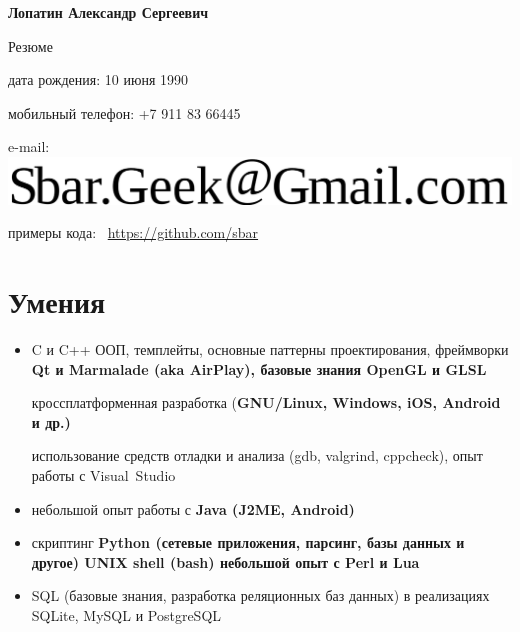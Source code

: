 \begin{center}
\fontsize{16pt}{14pt}\selectfont
\bfseries Лопатин Александр Сергеевич\mdseries

\fontsize{14pt}{14pt}\selectfont
Резюме
\end{center}
{
\fontsize{12pt}{12pt}\selectfont
\begin{flushright}
\item дата рождения: 10 июня 1990
\item мобильный телефон: +7 911 83 66445
\item e-mail: \includegraphics[scale=0.2]{email}
\item примеры кода: \
\href{https://github.com/sbar?tab=repositories}{https://github.com/sbar}
\end{flushright}
}

\setcounter{section}{0}
\section{Умения}
\begin{itemize}
\item C и C++
\subitem ООП, темплейты, основные паттерны проектирования,
фреймворки
\bfseries Qt \mdseries и
\bfseries Marmalade \mdseries
(aka \bfseries AirPlay\mdseries),
базовые знания \bfseries OpenGL \mdseries и \bfseries GLSL\mdseries

\subitem кроссплатформенная разработка
(\bfseries GNU/Linux\mdseries, Windows, iOS, \bfseries Android \mdseries и др.)

\subitem использование средств отладки и анализа (gdb, valgrind, cppcheck),
опыт работы с Visual~Studio

\item небольшой опыт работы с \bfseries Java \mdseries (J2ME, Android)

\item скриптинг
\subitem \bfseries Python \mdseries
(сетевые приложения, парсинг, базы данных и другое)
\subitem \bfseries UNIX shell (bash)\mdseries
\subitem небольшой опыт с \bfseries Perl \mdseries и \bfseries Lua\mdseries

\item SQL (базовые знания, разработка реляционных баз данных)
в реализациях SQLite, MySQL и PostgreSQL
\end{itemize}

